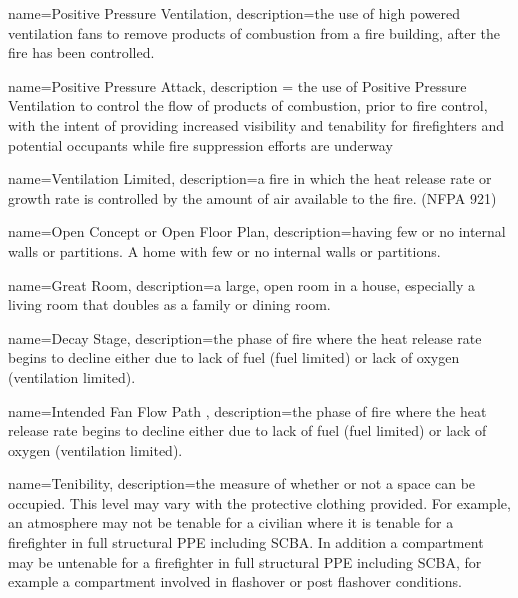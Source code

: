 {
	name={Positive Pressure Ventilation},
	description={the use of high powered ventilation fans to remove products of combustion from a fire building, after the fire has been controlled.}
}

{
	name={Positive Pressure Attack},
	description = {the use of Positive Pressure Ventilation to control the flow of products of combustion, prior to fire control, with the intent of providing increased visibility and tenability for firefighters and potential occupants while fire suppression efforts are underway}
}

{
	name=Ventilation Limited,
	description={a fire in which the heat release rate or growth rate is controlled by the amount of air available to the fire. (NFPA 921)}
}

{
	name=Open Concept or Open Floor Plan,
	description={having few or no internal walls or partitions. A home with few or no internal walls or partitions.}
}

{
	name=Great Room,
	description={a large, open room in a house, especially a living room that doubles as a family or dining room.}
}

{
	name=Decay Stage,
	description={the phase of fire where the heat release rate begins to decline either due to lack of fuel (fuel limited) or lack of oxygen (ventilation limited).}
}

{
	name=Intended Fan Flow Path ,
	description={the phase of fire where the heat release rate begins to decline either due to lack of fuel (fuel limited) or lack of oxygen (ventilation limited).}
}

{
	name=Tenibility,
	description={the measure of whether or not a space can be occupied. This level may vary with the protective clothing provided. For example, an atmosphere may not be tenable for a civilian where it is tenable for a firefighter in full structural PPE including SCBA. In addition a compartment may be untenable for a firefighter in full structural PPE including SCBA, for example a compartment involved in flashover or post flashover conditions. }
}